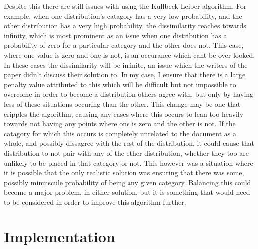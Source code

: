 \documentclass[letterpaper]{article}
\begin{document}
Despite this there are still issues with using the Kullbeck-Leiber algorithm. For example, when one distribution's catagory has a very low probability, and the other distribution has a very high probability, the dissimilarity reaches towards infinity, which is most prominent as an issue when one distribution has a probability of zero for a particular category and the other does not. This case, where one value is zero and one is not, is an occurance which cant be over looked. In these cases the dissimilarity will be infinite, an issue which the writers of the paper didn't discuss their solution to. In my case, I ensure that there is a large penalty value attributed to this which will be difficult but not impossible to overcome in order to become a distribution others agree with, but only by having less of these situations occuring than the other. This change may be one that cripples the algorithm, causing any cases where this occurs to lean too heavily towards not having any points where one is zero and the other is not. If the catagory for which this occurs is completely unrelated to the document as a whole, and possibly dissagree with the rest of the distribution, it could cause that distribution to not pair with any of the other distribution, whether they too are unlikely to be placed in that category or not. This however was a situation where it is possible that the only realistic solution was ensuring that there was some, possibly minuiscule probability of being any given category. Balancing this could become a major problem, in either solution, but it is something that would need to be considered in order to improve this algorithm further. 



\section{Implementation}
\end{document}
